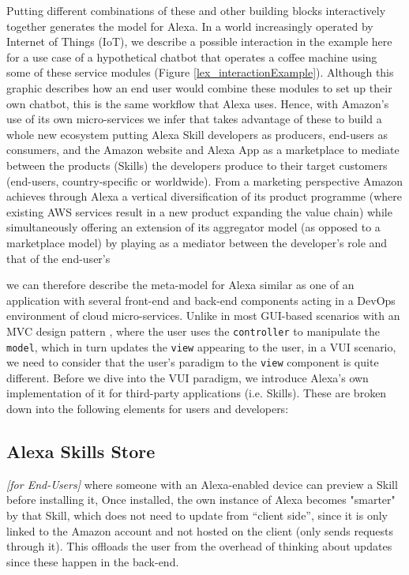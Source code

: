 Putting different combinations of these and other building blocks interactively together generates the model for Alexa. In a world increasingly operated by Internet of Things (IoT), we describe a possible interaction in the example here for a use case of a hypothetical chatbot that operates a coffee machine using some of these service modules (Figure \ref{lex_interactionExample}).  Although this graphic describes how an end user would combine these modules to set up their own chatbot, this is the same workflow that Alexa uses. Hence, with Amazon's use of its own micro-services we infer that takes advantage of these to build a whole new ecosystem putting Alexa Skill developers as producers, end-users as consumers, and the Amazon website and Alexa App as a marketplace to mediate between the products (Skills) the developers produce to their target customers (end-users, country-specific or worldwide). From a marketing perspective Amazon achieves through Alexa a vertical diversification of its product programme (where existing AWS services result in a new product expanding the value chain) while simultaneously offering an extension of its aggregator model (as opposed to a marketplace model)%
 by playing as a mediator between the developer's role and that of the end-user's %




we can therefore describe the meta-model for Alexa similar as one %
of an application with several front-end and back-end components acting in a DevOps environment of cloud micro-services. Unlike in most GUI-based scenarios with an MVC design pattern \cite{wiki:mvc}, where the user uses the \texttt{controller} to manipulate the \texttt{model}, which in turn updates the \texttt{view} appearing to the user, in a VUI scenario, we need to consider that the user's paradigm to the \texttt{view} component is quite different. Before we dive into the VUI paradigm, we introduce Alexa's own implementation of it for third-party applications (i.e. Skills). These are broken down into the following elements for users and developers: %



	
	\subsection*{Alexa Skills Store} \textit{[for End-Users]} where someone with an Alexa-enabled device can preview a Skill before installing it, %
	Once installed, the own instance of Alexa becomes "smarter" by that Skill, which does not need to update from ``client side'', since it is only linked to the Amazon account and not hosted on the client (only sends requests through it).  %
	This offloads the user from the overhead of %
	thinking about updates since these happen in the back-end. 
	
